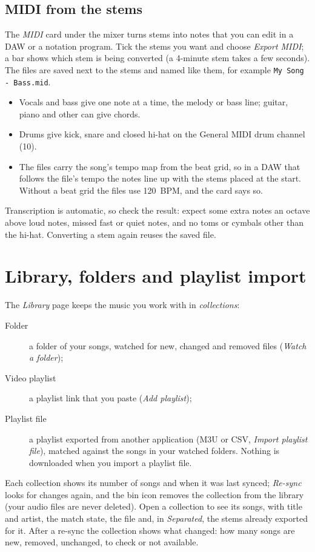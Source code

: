 \documentclass{covermaker}
\begin{document}
\section{MIDI from the stems}
The \emph{MIDI} card under the mixer turns stems into notes that you can edit
in a DAW or a notation program. Tick the stems you want and choose
\emph{Export MIDI}; a bar shows which stem is being converted (a 4-minute stem
takes a few seconds). The files are saved next to the stems and named like
them, for example \texttt{My Song - Bass.mid}.
\begin{itemize}
  \item Vocals and bass give one note at a time, the melody or bass line;
  guitar, piano and other can give chords.
  \item Drums give kick, snare and closed hi-hat on the General MIDI drum
  channel (10).
  \item The files carry the song's tempo map from the beat grid, so in a DAW
  that follows the file's tempo the notes line up with the stems placed at the
  start. Without a beat grid the files use 120~BPM, and the card says so.
\end{itemize}
Transcription is automatic, so check the result: expect some extra notes an
octave above loud notes, missed fast or quiet notes, and no toms or cymbals
other than the hi-hat. Converting a stem again reuses the saved file.

\chapter{Library, folders and playlist import}
The \emph{Library} page keeps the music you work with in \emph{collections}:
\begin{description}
  \item[Folder] a folder of your songs, watched for new, changed and removed
  files (\emph{Watch a folder});
  \item[Video playlist] a playlist link that you paste (\emph{Add playlist});
  \item[Playlist file] a playlist exported from another application (M3U or
  CSV, \emph{Import playlist file}), matched against the songs in your watched
  folders. Nothing is downloaded when you import a playlist file.
\end{description}
Each collection shows its number of songs and when it was last synced;
\emph{Re-sync} looks for changes again, and the bin icon removes the collection
from the library (your audio files are never deleted). Open a collection to see
its songs, with title and artist, the match state, the file and, in
\emph{Separated}, the stems already exported for it. After a re-sync the
collection shows what changed: how many songs are new, removed, unchanged, to
check or not available.
\end{document}
